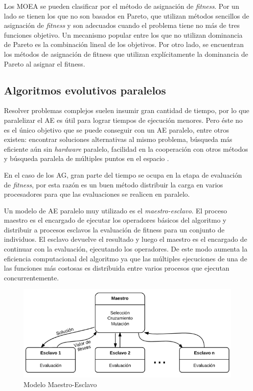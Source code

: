 Los MOEA se pueden clasificar por el método de asignación de \emph{fitness}. Por un lado se tienen los que no son basados en Pareto, que utilizan métodos sencillos de asignación de \emph{fitness} y son adecuados cuando el problema tiene no más de tres funciones objetivo. Un mecanismo popular entre los que no utilizan dominancia de Pareto es la combinación lineal de los objetivos. Por otro lado, se encuentran los métodos de asignación de fitness que utilizan explícitamente la dominancia de Pareto al asignar el fitness.




\subsection{Algoritmos evolutivos paralelos}
Resolver problemas complejos suelen insumir gran cantidad de tiempo, por lo que paralelizar el AE es útil para lograr tiempos de ejecución menores. Pero éste no es el único objetivo que se puede conseguir con un AE paralelo, entre otros existen: encontrar soluciones alternativas al mismo problema, búsqueda más eficiente aún sin \emph{hardware} paralelo, facilidad en la cooperación con otros métodos y búsqueda paralela de múltiples puntos en el espacio \citep{Alba2002}. 

En el caso de los AG, gran parte del tiempo se ocupa en la etapa de evaluación de \emph{fitness}, por esta razón es un buen método distribuir la carga en varios procesadores para que las evaluaciones se realicen en paralelo. 

Un modelo de AE paralelo muy utilizado es el \emph{maestro-esclavo}. El proceso maestro es el encargado de ejecutar los operadores básicos del algoritmo y distribuir a procesos esclavos la evaluación de  fitness para un conjunto de individuos. El esclavo devuelve el resultado y luego el maestro es el encargado de continuar con la evaluación, ejecutando los operadores. De este modo aumenta la eficiencia computacional del algoritmo ya que las múltiples ejecuciones de una de las funciones más costosas es distribuida entre varios procesos que ejecutan concurrentemente.

\begin{figure}[ht]
	\centering
	\includegraphics[width=0.9\linewidth]{Figures/diagrama-master-slave}
	\caption[Modelo Maestro-Esclavo]{Modelo Maestro-Esclavo}
	\label{fig:diagrama-master-slave}
\end{figure}

